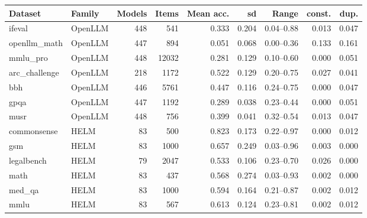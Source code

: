 \begin{tabular}{llrrrrrrr}
\toprule
Dataset & Family & Models & Items & Mean acc. & sd & Range & const. & dup.\\
\midrule
ifeval & OpenLLM & 448 & 541 & 0.333 & 0.204 & 0.04--0.88 & 0.013 & 0.047 \\
openllm\_math & OpenLLM & 447 & 894 & 0.051 & 0.068 & 0.00--0.36 & 0.133 & 0.161 \\
mmlu\_pro & OpenLLM & 448 & 12032 & 0.281 & 0.129 & 0.10--0.60 & 0.000 & 0.051 \\
arc\_challenge & OpenLLM & 218 & 1172 & 0.522 & 0.129 & 0.20--0.75 & 0.027 & 0.041 \\
bbh & OpenLLM & 446 & 5761 & 0.447 & 0.116 & 0.24--0.75 & 0.000 & 0.047 \\
gpqa & OpenLLM & 447 & 1192 & 0.289 & 0.038 & 0.23--0.44 & 0.000 & 0.051 \\
musr & OpenLLM & 448 & 756 & 0.399 & 0.041 & 0.32--0.54 & 0.013 & 0.047 \\
commonsense & HELM & 83 & 500 & 0.823 & 0.173 & 0.22--0.97 & 0.000 & 0.012 \\
gsm & HELM & 83 & 1000 & 0.657 & 0.249 & 0.03--0.96 & 0.003 & 0.000 \\
legalbench & HELM & 79 & 2047 & 0.533 & 0.106 & 0.23--0.70 & 0.026 & 0.000 \\
math & HELM & 83 & 437 & 0.568 & 0.274 & 0.03--0.93 & 0.002 & 0.000 \\
med\_qa & HELM & 83 & 1000 & 0.594 & 0.164 & 0.21--0.87 & 0.002 & 0.012 \\
mmlu & HELM & 83 & 567 & 0.613 & 0.124 & 0.23--0.81 & 0.002 & 0.012 \\
\bottomrule
\end{tabular}
